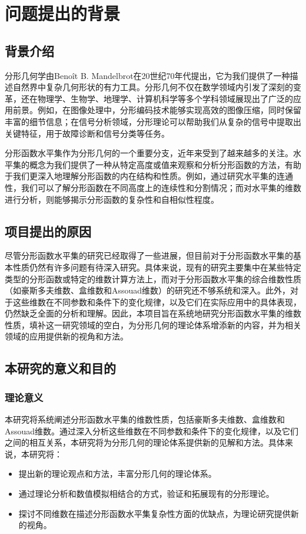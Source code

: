 \section{问题提出的背景}

\subsection{背景介绍}
分形几何学由Benoît B. Mandelbrot在20世纪70年代提出，它为我们提供了一种描述自然界中复杂几何形状的有力工具。分形几何不仅在数学领域内引发了深刻的变革，还在物理学、生物学、地理学、计算机科学等多个学科领域展现出了广泛的应用前景。例如，在图像处理中，分形编码技术能够实现高效的图像压缩，同时保留丰富的细节信息；在信号分析领域，分形理论可以帮助我们从复杂的信号中提取出关键特征，用于故障诊断和信号分类等任务。

分形函数水平集作为分形几何的一个重要分支，近年来受到了越来越多的关注。水平集的概念为我们提供了一种从特定高度或值来观察和分析分形函数的方法，有助于我们更深入地理解分形函数的内在结构和性质。例如，通过研究水平集的连通性，我们可以了解分形函数在不同高度上的连续性和分割情况；而对水平集的维数进行分析，则能够揭示分形函数的复杂性和自相似性程度。

\subsection{项目提出的原因}
尽管分形函数水平集的研究已经取得了一些进展，但目前对于分形函数水平集的基本性质仍然有许多问题有待深入研究。具体来说，现有的研究主要集中在某些特定类型的分形函数或特定的维数计算方法上，而对于分形函数水平集的综合维数性质（如豪斯多夫维数、盒维数和Assouad维数）的研究还不够系统和深入。此外，对于这些维数在不同参数和条件下的变化规律，以及它们在实际应用中的具体表现，仍然缺乏全面的分析和理解。因此，本项目旨在系统地研究分形函数水平集的维数性质，填补这一研究领域的空白，为分形几何的理论体系增添新的内容，并为相关领域的应用提供新的视角和方法。

\subsection{本研究的意义和目的}

\subsubsection{理论意义}
本研究将系统阐述分形函数水平集的维数性质，包括豪斯多夫维数、盒维数和Assouad维数。通过深入分析这些维数在不同参数和条件下的变化规律，以及它们之间的相互关系，本研究将为分形几何的理论体系提供新的见解和方法。具体来说，本研究将：
\begin{itemize}
      \item 提出新的理论观点和方法，丰富分形几何的理论体系。
      \item 通过理论分析和数值模拟相结合的方式，验证和拓展现有的分形理论。
      \item 探讨不同维数在描述分形函数水平集复杂性方面的优缺点，为理论研究提供新的视角。
\end{itemize}

